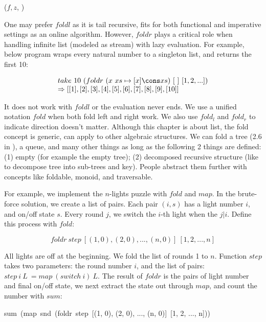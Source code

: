 \documentclass[b5paper]{article}
\begin{document}
\begin{algorithmic}[1]
  \State \Return {}($f, z$, )
\EndFunction
\end{algorithmic}

One may prefer $foldl$ as it is tail recursive, fits for both functional and imperative settings as an online algorithm. However, $foldr$ plays a critical role when handling infinite list (modeled as stream) with lazy evaluation. For example, below program wraps every natural number to a singleton list, and returns the first 10:

\[
\begin{array}{l}
take\ 10\ (foldr\ (x\ xs \mapsto [x] \cons xs)\ [\ ]\ [1, 2, ...]) \\
\Rightarrow [[1], [2], [3], [4], [5], [6], [7], [8], [9], [10]]
\end{array}
\]

It does not work with $foldl$ or the evaluation never ends. We use a unified notation $fold$ when both fold left and right work. We also use $fold_l$ and $fold_r$ to indicate direction doesn't matter. Although this chapter is about list, the fold concept is generic, can apply to other algebraic structures. We can fold a tree (2.6 in \cite{unplugged}), a queue, and many other things as long as the following 2 things are defined: (1) empty (for example the empty tree); (2) decomposed recursive structure (like to decompose tree into sub-trees and key). People abstract them further with concepts like foldable, monoid, and traversable.

For example, we implement the $n$-lights puzzle with $fold$ and $map$. In the brute-force solution, we create a list of pairs. Each pair $(i, s)$ has a light number $i$, and on/off state $s$. Every round $j$, we switch the $i$-th light when the $j | i$. Define this process with $fold$:

\[
foldr\ step\ [(1, 0), (2, 0), ..., (n, 0)]\ [1, 2, ..., n]
\]

All lights are off at the beginning. We fold the list of rounds 1 to $n$. Function $step$ takes two parameters: the round number $i$, and the list of pairs: $step\ i\ L\ = map\ (switch\ i)\ L$. The result of $foldr$ is the pairs of light number and final on/off state, we next extract the state out through $map$, and count the number with $sum$:

\be
sum\ (map\ snd\ (foldr\ step\ [(1, 0), (2, 0), ..., (n, 0)]\ [1, 2, ..., n]))
\ee
\end{document}
